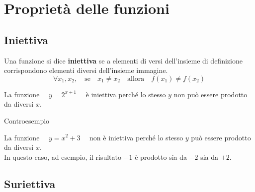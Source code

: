 
\section{Proprietà delle funzioni}
\label{sec:funzioni2_proprieta}

\subsection{Iniettiva}

\begin{definizione}
Una funzione si dice \textbf{iniettiva} se a elementi di versi dell'insieme 
di definizione corrispondono elementi diversi dell'insieme immagine.
\[\forall x_1, x_2, \quad \text{se} \quad x_1 \ne x_2 
\quad \text{allora} \quad f(x_1) \ne f(x_2)\]
\end{definizione}

\begin{minipage}{.45\textwidth}
\begin{esempio}

La funzione \(\quad y = 2^{x+1} \quad\) è iniettiva perché lo stesso \(y\) non 
può essere prodotto da diversi \(x\).
\end{esempio}
\begin{center}
\end{center}

\end{minipage}
\hfill
\begin{minipage}{.45\textwidth}
\begin{esempio}Controesempio

La funzione \(\quad y = x^2+3 \quad\) non è iniettiva perché lo stesso \(y\) 
può essere prodotto da diversi \(x\).\\
In questo caso, ad esempio, il risultato \(-1\) è prodotto sia da \(-2\) sia 
da \(+2\).
\end{esempio}
\begin{center}
\end{center}
\end{minipage}

\subsection{Suriettiva}

